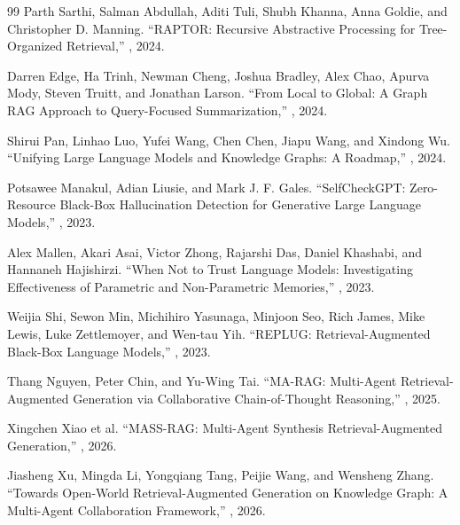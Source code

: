 \begin{thebibliography}{99}
Parth Sarthi, Salman Abdullah, Aditi Tuli, Shubh Khanna, Anna Goldie,
and Christopher D. Manning.
\newblock ``RAPTOR: Recursive Abstractive Processing for Tree-Organized Retrieval,''
, 2024.
 
Darren Edge, Ha Trinh, Newman Cheng, Joshua Bradley, Alex Chao, Apurva Mody,
Steven Truitt, and Jonathan Larson.
\newblock ``From Local to Global: A Graph RAG Approach to Query-Focused
Summarization,''
, 2024.
 
Shirui Pan, Linhao Luo, Yufei Wang, Chen Chen, Jiapu Wang, and Xindong Wu.
\newblock ``Unifying Large Language Models and Knowledge Graphs: A Roadmap,''
, 2024.
 
Potsawee Manakul, Adian Liusie, and Mark J. F. Gales.
\newblock ``SelfCheckGPT: Zero-Resource Black-Box Hallucination Detection for
Generative Large Language Models,''
, 2023.
 
Alex Mallen, Akari Asai, Victor Zhong, Rajarshi Das, Daniel Khashabi,
and Hannaneh Hajishirzi.
\newblock ``When Not to Trust Language Models: Investigating Effectiveness of
Parametric and Non-Parametric Memories,''
, 2023.
 
Weijia Shi, Sewon Min, Michihiro Yasunaga, Minjoon Seo, Rich James,
Mike Lewis, Luke Zettlemoyer, and Wen-tau Yih.
\newblock ``REPLUG: Retrieval-Augmented Black-Box Language Models,''
, 2023.
 
Thang Nguyen, Peter Chin, and Yu-Wing Tai.
\newblock ``MA-RAG: Multi-Agent Retrieval-Augmented Generation via Collaborative
Chain-of-Thought Reasoning,''
, 2025.
 
Xingchen Xiao et al.
\newblock ``MASS-RAG: Multi-Agent Synthesis Retrieval-Augmented Generation,''
, 2026.
 
Jiasheng Xu, Mingda Li, Yongqiang Tang, Peijie Wang, and Wensheng Zhang.
\newblock ``Towards Open-World Retrieval-Augmented Generation on Knowledge Graph:
A Multi-Agent Collaboration Framework,''
, 2026.
 

\end{thebibliography}
